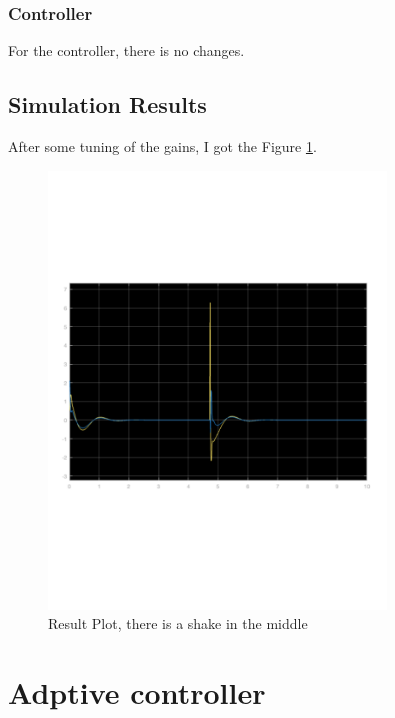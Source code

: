 \documentclass{article}
\begin{document}
\subsubsection*{Controller}
For the controller, there is no changes.\\


\subsection{Simulation Results}

After some tuning of the gains, I got the Figure \ref{fig:result_task_space_trajectory}. \\
\begin{figure}[ht]
    \centering
    \includegraphics[width=0.8\textwidth]{figures/result_task_space_trajectory.pdf}
    \caption{Result Plot, there is a shake in the middle}
    \label{fig:result_task_space_trajectory}
\end{figure}




\newpage

\section{\centering \Large Adptive controller} 
\end{document}

